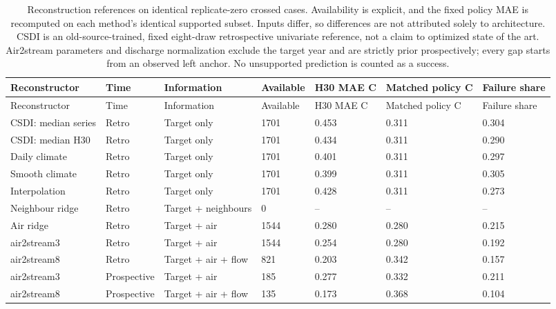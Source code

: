 {\tabletext
\setlength{\tabcolsep}{3pt}
\begin{longtable}{p{}p{}p{}p{}p{}p{}p{}}
\caption{Reconstruction references on identical replicate-zero crossed cases. Availability is explicit, and the fixed policy MAE is recomputed on each method's identical supported subset. Inputs differ, so differences are not attributed solely to architecture. CSDI is an old-source-trained, fixed eight-draw retrospective univariate reference, not a claim to optimized state of the art. Air2stream parameters and discharge normalization exclude the target year and are strictly prior prospectively; every gap starts from an observed left anchor. No unsupported prediction is counted as a success.}\label{tab:r3si-reconstruction_references}\\
\toprule
Reconstructor & Time & Information & Available & H30 MAE C & Matched policy C & Failure share \\
\midrule
\endfirsthead
\toprule
Reconstructor & Time & Information & Available & H30 MAE C & Matched policy C & Failure share \\
\midrule
\endhead
CSDI: median series & Retro & Target only & 1701 & 0.453 & 0.311 & 0.304 \\
CSDI: median H30 & Retro & Target only & 1701 & 0.434 & 0.311 & 0.290 \\
Daily climate & Retro & Target only & 1701 & 0.401 & 0.311 & 0.297 \\
Smooth climate & Retro & Target only & 1701 & 0.399 & 0.311 & 0.305 \\
Interpolation & Retro & Target only & 1701 & 0.428 & 0.311 & 0.273 \\
Neighbour ridge & Retro & Target + neighbours & 0 & -- & -- & -- \\
Air ridge & Retro & Target + air & 1544 & 0.280 & 0.280 & 0.215 \\
air2stream3 & Retro & Target + air & 1544 & 0.254 & 0.280 & 0.192 \\
air2stream8 & Retro & Target + air + flow & 821 & 0.203 & 0.342 & 0.157 \\
air2stream3 & Prospective & Target + air & 185 & 0.277 & 0.332 & 0.211 \\
air2stream8 & Prospective & Target + air + flow & 135 & 0.173 & 0.368 & 0.104 \\
\bottomrule
\end{longtable}
}


